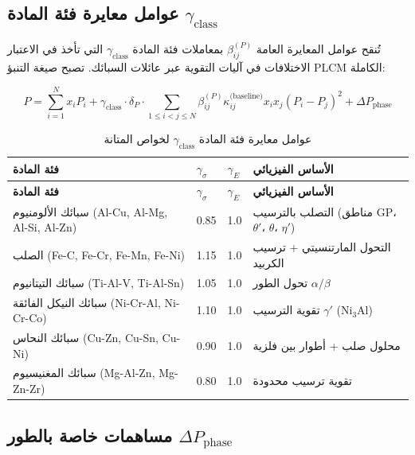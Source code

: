 \documentclass[11pt,a4paper]{article}
\begin{document}
\begin{otherlanguage}{arabic}
		\subsection{عوامل معايرة فئة المادة \(\gamma_{\text{class}}\)}
		\label{subsec:material-class-factors}
		
		تُنقح عوامل المعايرة العامة \(\beta_{ij}^{(P)}\) بمعاملات فئة المادة \(\gamma_{\text{class}}\) التي تأخذ في الاعتبار الاختلافات في آليات التقوية عبر عائلات السبائك. تصبح صيغة التنبؤ PLCM الكاملة:
		
		\begin{equation}
			\boxed{P = \sum_{i=1}^{N} x_i P_i + \gamma_{\text{class}} \cdot \delta_P \cdot \sum_{1\le i<j\le N} \beta_{ij}^{(P)} \kappa_{ij}^{\text{(baseline)}} x_i x_j (P_i - P_j)^2 + \Delta P_{\text{phase}}}
			\label{eq:plcm-full-calibration}
		\end{equation}
		
		\begin{longtable}{p{3.5cm}p{2.5cm}p{2.5cm}p{5cm}}
			\caption{عوامل معايرة فئة المادة \(\gamma_{\text{class}}\) لخواص المتانة} \label{tab:material-class-factors} \\
			\toprule
			\textbf{فئة المادة} & \(\gamma_{\sigma}\) & \(\gamma_{E}\) & \textbf{الأساس الفيزيائي} \\
			\midrule
			\endfirsthead
			\toprule
			\textbf{فئة المادة} & \(\gamma_{\sigma}\) & \(\gamma_{E}\) & \textbf{الأساس الفيزيائي} \\
			\midrule
			\endhead
			سبائك الألومنيوم (Al-Cu, Al-Mg, Al-Si, Al-Zn) & 0.85 & 1.0 & التصلب بالترسيب (مناطق GP، \(\theta'\)، \(\theta\)، \(\eta'\)) \\
			الصلب (Fe-C, Fe-Cr, Fe-Mn, Fe-Ni) & 1.15 & 1.0 & التحول المارتنسيتي + ترسيب الكربيد \\
			سبائك التيتانيوم (Ti-Al-V, Ti-Al-Sn) & 1.05 & 1.0 & تحول الطور \(\alpha/\beta\) \\
			سبائك النيكل الفائقة (Ni-Cr-Al, Ni-Cr-Co) & 1.10 & 1.0 & تقوية الترسيب \(\gamma'\) (Ni\(_3\)Al) \\
			سبائك النحاس (Cu-Zn, Cu-Sn, Cu-Ni) & 0.90 & 1.0 & محلول صلب + أطوار بين فلزية \\
			سبائك المغنيسيوم (Mg-Al-Zn, Mg-Zn-Zr) & 0.80 & 1.0 & تقوية ترسيب محدودة \\
			\bottomrule
		\end{longtable}
		
		\subsection{مساهمات خاصة بالطور \(\Delta P_{\text{phase}}\)}
		\label{subsec:phase-contributions}
		

\end{otherlanguage}
\end{document}
